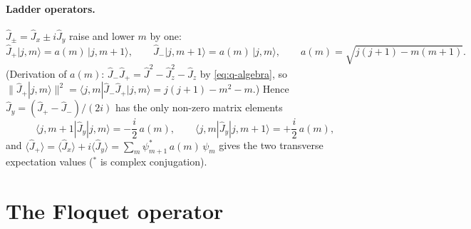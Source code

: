 \documentclass[11pt,a4paper]{article}
\begin{document}
\paragraph{Ladder operators.} $\hat J_\pm = \hat J_x \pm i\hat J_y$ raise and lower $m$ by one:
\begin{equation}\label{eq:ladder}
  \hat J_+|j,m\rangle = a(m)\,|j,m+1\rangle, \qquad \hat J_-|j,m+1\rangle = a(m)\,|j,m\rangle, \qquad
  a(m) = \sqrt{j(j+1) - m(m+1)} .
\end{equation}
(Derivation of $a(m)$: $\hat J_-\hat J_+ = \hat J^2 - \hat J_z^2 - \hat J_z$ by \eqref{eq:q-algebra}, so
$\|\hat J_+|j,m\rangle\|^2 = \langle j,m|\hat J_-\hat J_+|j,m\rangle = j(j+1) - m^2 - m$.) Hence $\hat J_y = (\hat J_+ -
\hat J_-)/(2i)$ has the only non-zero matrix elements
\begin{equation}\label{eq:jy-elements}
  \langle j,m+1|\hat J_y|j,m\rangle = -\frac{i}{2}\,a(m), \qquad \langle j,m|\hat J_y|j,m+1\rangle = +\frac{i}{2}\,a(m),
\end{equation}
and $\langle\hat J_+\rangle = \langle\hat J_x\rangle + i\langle\hat J_y\rangle = \sum_m \psi_{m+1}^*\,a(m)\,\psi_m$
gives the two transverse expectation values ($^*$ is complex conjugation).

\section{The Floquet operator}\label{sec:floquet}
\end{document}
